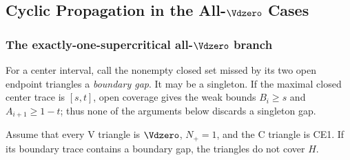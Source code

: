 \subsection{Cyclic Propagation in the All-\texorpdfstring{$\Vdzero$}{Vd0} Cases}
\label{sec:cyclic-all-vd0}

\subsubsection{The exactly-one-supercritical all-\texorpdfstring{$\Vdzero$}{Vd0} branch}

For a center interval, call the nonempty closed set missed by its two open
endpoint triangles a \emph{boundary gap}. It may be a singleton. If the maximal
closed center trace is $[s,t]$, open coverage gives the weak bounds
$B_i\ge s$ and $A_{i+1}\ge1-t$; thus none of the arguments below discards a
singleton gap.

\begin{proposition}
\label{prop:ce1-one-gap}
\label{thm:s2-geom-r1}
Assume that every V triangle is $\Vdzero$, $N_+=1$, and the C triangle is
CE1. If its boundary trace contains a boundary gap, the triangles do not
cover $H$.
\end{proposition}

